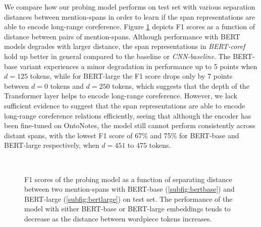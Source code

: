 \documentclass[11pt]{article}
\begin{document}
We compare how our probing model performs on test set with various separation distances between mention-spans in order to learn if the span representations are able to encode long-range coreference. Figure \ref{fig:longrange_result} depicts F1 scores as a function of distance between pairs of mention-spans. Although performance with BERT models degrades with larger distance, the span representations in \textit{BERT-coref} hold up better in general compared to the baseline or \textit{CNN-baseline}. The BERT-base variant experiences a minor degradation in performance up to 5 points when $d=125$ tokens, while for BERT-large the F1 score drops only by 7 points between $d=0$ tokens and $d=250$ tokens, which suggests that the depth of the Transformer layer helps to encode long-range coreference. However, we lack sufficient evidence to suggest that the span representations are able to encode long-range coreference relations efficiently, seeing that although the encoder has been fine-tuned on OntoNotes, the model still cannot perform consistently across distant spans, with the lowest F1 score of 67\% and 75\% for BERT-base and BERT-large respectively, when $d=451$ to $475$ tokens.
\begin{figure}[h!]
 \\
  \caption{F1 scores of the probing model as a function of separating distance between two mention-spans with BERT-base (\ref{subfig:bertbase}) and BERT-large (\ref{subfig:bertlarge}) on test set. The performance of the model with either BERT-base or BERT-large embeddings tends to decrease as the distance between wordpiece tokens increases.}
  \label{fig:longrange_result} 
\end{figure}
\end{document}
